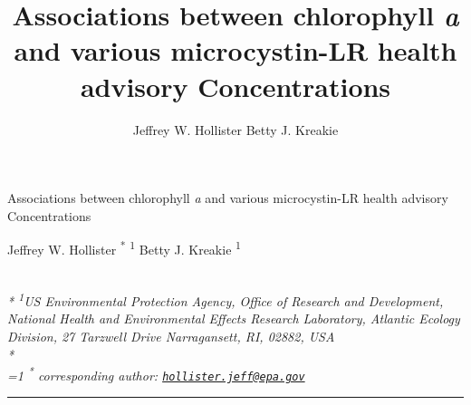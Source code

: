 \documentclass[11pt,]{article}
\title{Associations between chlorophyll \emph{a} and various microcystin-LR
health advisory Concentrations}
\author{
Jeffrey W. Hollister
Betty J. Kreakie
}
\date{}
\begin{document}
\begin{singlespace}
\begin{center}
\huge Associations between chlorophyll \emph{a} and various microcystin-LR
health advisory Concentrations
\end{center}
\begin{center}
\large
Jeffrey W. Hollister \textsuperscript{*} \textsuperscript{1} 
Betty J. Kreakie \textsuperscript{1} 
\end{center}
\begin{justify}
\footnotesize \emph{ 
\\*
\textsuperscript{1}US Environmental Protection Agency, Office of Research and Development,
National Health and Environmental Effects Research Laboratory, Atlantic
Ecology Division, 27 Tarzwell Drive Narragansett, RI, 02882, USA\\*
}
\setcounter{num}{1}
\\[0.1cm]
\footnotesize \emph{ 
\ifnum\value{num}=1%
\textsuperscript{*} corresponding author:
\fi
\href{mailto:hollister.jeff@epa.gov}{\nolinkurl{hollister.jeff@epa.gov}}
}
\end{justify}
\normalsize

\end{singlespace}


\singlespace

\vspace{2mm}

\hrule
\end{document}
